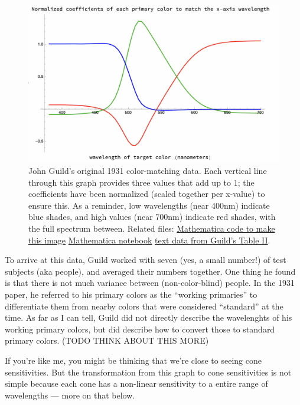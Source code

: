 \documentclass[
]{article}
\begin{document}
\begin{figure}
\centering
\begin{center}\includegraphics[width=1.0\textwidth]{img/color_matching_coeffs.png}\end{center}
\caption{John Guild's original 1931 color-matching data. Each vertical
line through this graph provides three values that add up to 1; the
coefficients have been normalized (scaled together per x-value) to
ensure this. As a reminder, low wavelengths (near 400nm) indicate blue
shades, and high values (near 700nm) indicate red shades, with the full
spectrum between. Related files:
\href{color_matching/plot_color_matching_coeffs.htm}{Mathematica code to
make this image} \textbar{}
\href{color_matching/plot_color_matching_coeffs.nb}{Mathematica
notebook} \textbar{}
\href{color_matching/guild_color_matching_data.math}{text data from
Guild's Table II}.}
\end{figure}

To arrive at this data, Guild worked with seven (yes, a small number!)
of test subjects (aka people), and averaged their numbers together. One
thing he found is that there is not much variance between
(non-color-blind) people. In the 1931 paper, he referred to his primary
colors as the ``working primaries'' to differentiate them from nearby
colors that were considered ``standard'' at the time. As far as I can
tell, Guild did not directly describe the wavelenghts of his working
primary colors, but did describe how to convert those to standard
primary colors. (TODO THINK ABOUT THIS MORE)

If you're like me, you might be thinking that we're close to seeing cone
sensitivities. But the transformation from this graph to cone
sensitivities is not simple because each cone has a non-linear
sensitivity to a entire range of wavelengths --- more on that below.
\end{document}
